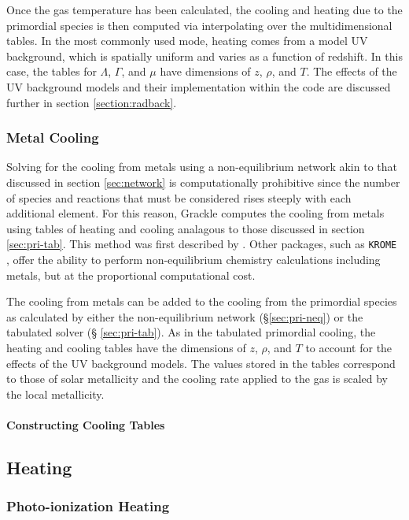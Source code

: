 Once the gas temperature has been calculated, the cooling and heating
due to the primordial species is then computed via interpolating over
the multidimensional tables.  In the most commonly used mode, heating
comes from a model UV background, which is spatially uniform and
varies as a function of redshift.  In this case, the tables for
$\Lambda$, $\Gamma$, and $\mu$ have dimensions of $z$, $\rho$, and
$T$.  The effects of the UV background models and their implementation
within the code are discussed further in section
\ref{section:radback}.

\subsubsection{Metal Cooling}

Solving for the cooling from metals using a non-equilibrium network
akin to that discussed in section \ref{sec:network} is computationally
prohibitive since the number of species and reactions that must be
considered rises steeply with each additional element.  For this
reason, Grackle computes the cooling from metals using tables of
heating and cooling analagous to those discussed in section
\ref{sec:pri-tab}.  This method was first described by
\citet{2008MNRAS.385.1443S}.  Other packages, such as \texttt{KROME}
\citep{2014MNRAS.439.2386G}, offer the ability to perform
non-equilibrium chemistry calculations including metals, but at the
proportional computational cost.

The cooling from metals can be added to the cooling from the
primordial species as calculated by either the non-equilibrium network
(\S \ref{sec:pri-neq}) or the tabulated solver (\S
\ref{sec:pri-tab}).  As in the tabulated primordial cooling, the
heating and cooling tables have the dimensions of $z$, $\rho$, and
$T$ to account for the effects of the UV background models.  The
values stored in the tables correspond to those of solar metallicity
and the cooling rate applied to the gas is scaled by the local
metallicity.

\paragraph{Constructing Cooling Tables} \label{sec:cooling-tables}


\subsection{Heating}


\subsubsection{Photo-ionization Heating}


